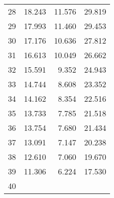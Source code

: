 \begin{tabular}{llll}
\multicolumn{1}{l}{\hspace{1em}28} &
  \multicolumn{1}{|r}{18.243} &
  \multicolumn{1}{r}{11.576} &
  \multicolumn{1}{r}{29.819} \\
\multicolumn{1}{l}{\hspace{1em}29} &
  \multicolumn{1}{|r}{17.993} &
  \multicolumn{1}{r}{11.460} &
  \multicolumn{1}{r}{29.453} \\
\multicolumn{1}{l}{\hspace{1em}30} &
  \multicolumn{1}{|r}{17.176} &
  \multicolumn{1}{r}{10.636} &
  \multicolumn{1}{r}{27.812} \\
\multicolumn{1}{l}{\hspace{1em}31} &
  \multicolumn{1}{|r}{16.613} &
  \multicolumn{1}{r}{10.049} &
  \multicolumn{1}{r}{26.662} \\
\multicolumn{1}{l}{\hspace{1em}32} &
  \multicolumn{1}{|r}{15.591} &
  \multicolumn{1}{r}{9.352} &
  \multicolumn{1}{r}{24.943} \\
\multicolumn{1}{l}{\hspace{1em}33} &
  \multicolumn{1}{|r}{14.744} &
  \multicolumn{1}{r}{8.608} &
  \multicolumn{1}{r}{23.352} \\
\multicolumn{1}{l}{\hspace{1em}34} &
  \multicolumn{1}{|r}{14.162} &
  \multicolumn{1}{r}{8.354} &
  \multicolumn{1}{r}{22.516} \\
\multicolumn{1}{l}{\hspace{1em}35} &
  \multicolumn{1}{|r}{13.733} &
  \multicolumn{1}{r}{7.785} &
  \multicolumn{1}{r}{21.518} \\
\multicolumn{1}{l}{\hspace{1em}36} &
  \multicolumn{1}{|r}{13.754} &
  \multicolumn{1}{r}{7.680} &
  \multicolumn{1}{r}{21.434} \\
\multicolumn{1}{l}{\hspace{1em}37} &
  \multicolumn{1}{|r}{13.091} &
  \multicolumn{1}{r}{7.147} &
  \multicolumn{1}{r}{20.238} \\
\multicolumn{1}{l}{\hspace{1em}38} &
  \multicolumn{1}{|r}{12.610} &
  \multicolumn{1}{r}{7.060} &
  \multicolumn{1}{r}{19.670} \\
\multicolumn{1}{l}{\hspace{1em}39} &
  \multicolumn{1}{|r}{11.306} &
  \multicolumn{1}{r}{6.224} &
  \multicolumn{1}{r}{17.530} \\
\multicolumn{1}{l}{\hspace{1em}40} &

\end{tabular}

